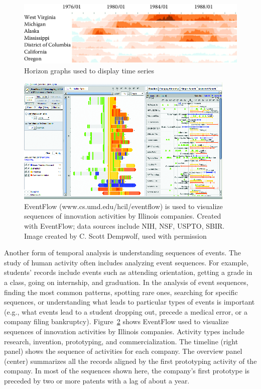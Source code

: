 \documentclass[]{krantz}
\begin{document}
\begin{figure}

{\centering \includegraphics[width=0.7\linewidth]{ChapterViz/figures/fig9-6} 

}

\caption{Horizon graphs used to display time series}\label{fig:fig9-6}
\end{figure}

\begin{figure}

{\centering \includegraphics[width=0.7\linewidth]{ChapterViz/figures/fig9-7} 

}

\caption{EventFlow (www.cs.umd.edu/hcil/eventflow) is used to visualize sequences of innovation activities by Illinois companies. Created with EventFlow; data sources include NIH, NSF, USPTO, SBIR. Image created by C. Scott Dempwolf, used with permission}\label{fig:fig9-7}
\end{figure}

Another form of temporal analysis is understanding sequences of events.
The study of human activity often includes analyzing event sequences.
For example, students' records include events such as attending
orientation, getting a grade in a class, going on internship, and
graduation. In the analysis of event sequences, finding the most common
patterns, spotting rare ones, searching for specific sequences, or
understanding what leads to particular types of events is important
(e.g., what events lead to a student dropping out, precede a medical
error, or a company filing bankruptcy). Figure~\ref{fig:fig9-7} shows
EventFlow used to visualize sequences of innovation activities by
Illinois companies. Activity types include research, invention,
prototyping, and commercialization. The timeline (right panel) shows the
sequence of activities for each company. The overview panel (center)
summarizes all the records aligned by the first prototyping activity of
the company. In most of the sequences shown here, the company's first
prototype is preceded by two or more patents with a lag of about a year.
\end{document}
